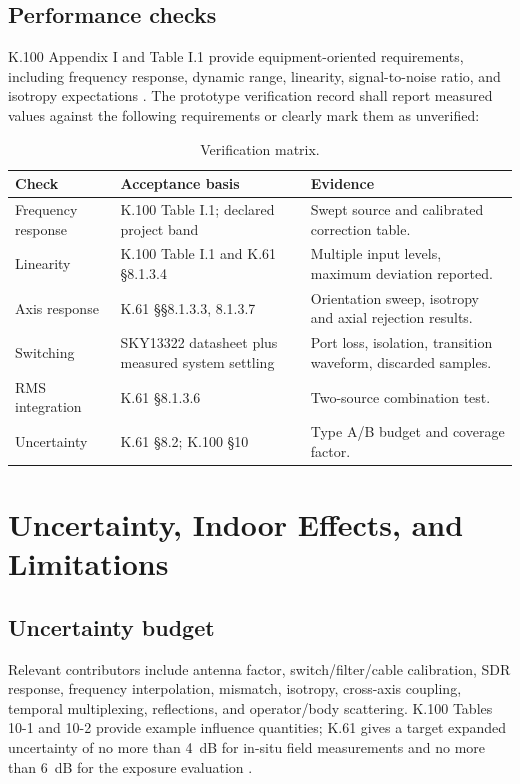 \documentclass[11pt,a4paper]{article}
\begin{document}
\subsection{Performance checks}
K.100 Appendix I and Table I.1 provide equipment-oriented requirements, including frequency response, dynamic range, linearity, signal-to-noise ratio, and isotropy expectations \cite[Appendix~I]{ITU-T-K.100}. The prototype verification record shall report measured values against the following requirements or clearly mark them as unverified:
\begin{table}[ht]
\centering
\caption{Verification matrix.}
\begin{tabularx}{\textwidth}{L{0.32\textwidth}L{0.28\textwidth}X}
\toprule
\textbf{Check} & \textbf{Acceptance basis} & \textbf{Evidence}\\
\midrule
Frequency response & K.100 Table I.1; declared project band & Swept source and calibrated correction table.\\
Linearity & K.100 Table I.1 and K.61 §8.1.3.4 & Multiple input levels, maximum deviation reported.\\
Axis response & K.61 §§8.1.3.3, 8.1.3.7 & Orientation sweep, isotropy and axial rejection results.\\
Switching & SKY13322 datasheet plus measured system settling & Port loss, isolation, transition waveform, discarded samples.\\
RMS integration & K.61 §8.1.3.6 & Two-source combination test.\\
Uncertainty & K.61 §8.2; K.100 §10 & Type A/B budget and coverage factor.\\
\bottomrule
\end{tabularx}
\end{table}

\section{Uncertainty, Indoor Effects, and Limitations}

\subsection{Uncertainty budget}
Relevant contributors include antenna factor, switch/filter/cable calibration, SDR response, frequency interpolation, mismatch, isotropy, cross-axis coupling, temporal multiplexing, reflections, and operator/body scattering. K.100 Tables 10-1 and 10-2 provide example influence quantities; K.61 gives a target expanded uncertainty of no more than 4~dB for in-situ field measurements and no more than 6~dB for the exposure evaluation \cite[Sec.~8.2]{ITU-T-K.61}.
\end{document}

